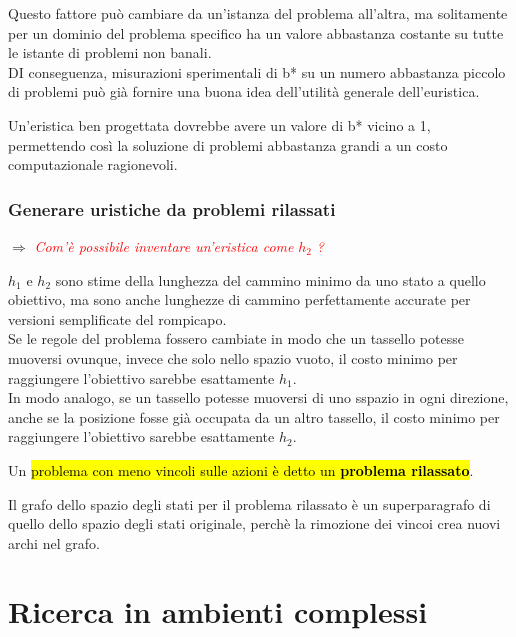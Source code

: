 \documentclass[12pt, a4paper, oneside]{book}
\begin{document}

    Questo fattore può cambiare da un'istanza del problema all'altra, ma solitamente per un dominio del problema specifico ha un valore abbastanza costante su tutte le istante di problemi non banali. \\[0.2ex]
    DI conseguenza, misurazioni sperimentali di b* su un numero abbastanza piccolo di problemi può già fornire una buona idea dell'utilità generale dell'euristica.

    Un'eristica ben progettata dovrebbe avere un valore di b* vicino a 1, permettendo così la soluzione di problemi abbastanza grandi a un costo computazionale ragionevoli.

    \subsection{Generare uristiche da problemi rilassati}
    $\Rightarrow$ \textcolor{red}{\textit{Com'è possibile inventare un'eristica come} $h_2$ \textit{?}}

    $h_1$ e $h_2$ sono stime della lunghezza del cammino minimo da uno stato a quello obiettivo, ma sono anche lunghezze di cammino perfettamente accurate per versioni semplificate del rompicapo. \\[0.2ex]
    Se le regole del problema fossero cambiate in modo che un tassello potesse muoversi ovunque, invece che solo nello spazio vuoto, il costo minimo per raggiungere l'obiettivo sarebbe esattamente $h_1$. \\[0.2ex]
    In modo analogo, se un tassello potesse muoversi di uno sspazio in ogni direzione, anche se la posizione fosse già occupata da un altro tassello, il costo minimo per raggiungere l'obiettivo sarebbe esattamente $h_2$.

    Un \hl{problema con meno vincoli sulle azioni è detto un \textbf{problema rilassato}}.

    Il grafo dello spazio degli stati per il problema rilassato è un superparagrafo di quello dello spazio degli stati originale, perchè la rimozione dei vincoi crea nuovi archi nel grafo.

    

    


    \chapter{Ricerca in ambienti complessi}
\end{document}
